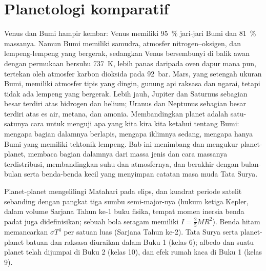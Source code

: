 \chapter{Planetologi komparatif}\label{ch:b1:comparative-planetology}

Venus dan Bumi hampir kembar: Venus memiliki \qty{95}{\percent} jari-jari Bumi dan \qty{81}{\percent} massanya. Namun Bumi memiliki samudra, atmosfer nitrogen--oksigen, dan lempeng-lempeng yang bergerak, sedangkan Venus bersembunyi di balik awan dengan permukaan bersuhu \qty{737}{K}, lebih panas daripada oven dapur mana pun, tertekan oleh atmosfer karbon dioksida pada \qty{92}{bar}. Mars, yang setengah ukuran Bumi, memiliki atmosfer tipis yang dingin, gunung api raksasa dan ngarai, tetapi tidak ada lempeng yang bergerak. Lebih jauh, Jupiter dan Saturnus sebagian besar terdiri atas hidrogen dan helium; Uranus dan Neptunus sebagian besar terdiri atas es air, metana, dan amonia. Membandingkan planet adalah satu-satunya cara untuk menguji apa yang kita kira kita ketahui tentang Bumi: mengapa bagian dalamnya berlapis, mengapa iklimnya sedang, mengapa hanya Bumi yang memiliki tektonik lempeng. Bab ini menimbang dan mengukur planet-planet, membaca bagian dalamnya dari massa jenis dan cara massanya terdistribusi, membandingkan suhu dan atmosfernya, dan berakhir dengan bulan-bulan serta benda-benda kecil yang menyimpan catatan masa muda Tata Surya.

\begin{recall}
Planet-planet mengelilingi Matahari pada elips, dan kuadrat periode satelit sebanding dengan pangkat tiga sumbu semi-major-nya (hukum ketiga Kepler, dalam volume Sarjana Tahun ke-1 buku fisika, tempat momen inersia benda padat juga didefinisikan; sebuah bola seragam memiliki $I = \tfrac25MR^2$). Benda hitam memancarkan $\sigma T^4$ per satuan luas (Sarjana Tahun ke-2). Tata Surya serta planet-planet batuan dan raksasa diuraikan dalam Buku 1 (kelas 6); albedo dan  suatu planet telah dijumpai di Buku 2 (kelas 10), dan efek rumah kaca di Buku 1 (kelas 9).
\end{recall}

